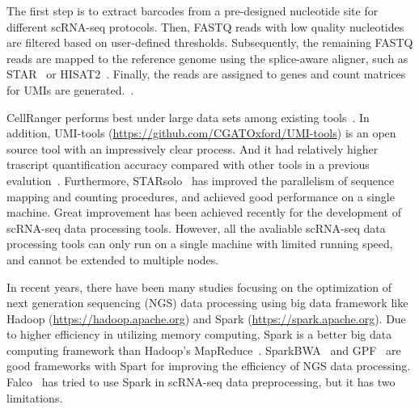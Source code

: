 \documentclass[conference]{IEEEtran}
\begin{document}
The first step is to extract barcodes from a pre-designed nucleotide site for different scRNA-seq protocols. Then, FASTQ reads with low quality nucleotides are filtered based on user-defined thresholds. 
Subsequently, the remaining FASTQ reads are mapped to the reference genome using the splice-aware aligner, such as STAR~\cite{Dobin2013STAR} or HISAT2~\cite{Kim2015HISAT}. 
Finally, the reads are assigned to genes and count matrices for UMIs are generated.~\cite{Parekh2018zUMIs}. 


CellRanger performs best under large data sets among existing tools~\cite{Gao2020Comparison}.
In addition, UMI-tools (\url{https://github.com/CGATOxford/UMI-tools}) is an open source tool with an impressively clear process. And it had relatively higher trascript quantification accuracy compared with other tools in a previous evalution~\cite{Gao2020Comparison}. 
Furthermore, STARsolo~\cite{Blibaum2019STARsolo} has improved the parallelism of sequence mapping and counting procedures, and achieved good performance on a single machine.
Great improvement has been achieved recently for the development of scRNA-seq data processing tools. However, all the avaliable scRNA-seq data processing tools can only run on a single machine with limited running speed, and cannot be extended to multiple nodes.

In recent years, there have been many studies focusing on the optimization of next generation sequencing (NGS) data processing using big data framework like Hadoop (\url{https://hadoop.apache.org}) and Spark (\url{https://spark.apache.org}). 
Due to higher efficiency in utilizing memory computing, Spark is a better big data computing framework than Hadoop's MapReduce~\cite{Dean2008MapReduce, Zaharia2012Resilient}. 
SparkBWA~\cite{Abun2016SparkBWA} and GPF~\cite{Li2018Highperformance} are good frameworks with Spart for improving the efficiency of NGS data processing. 
Falco~\cite{Yang2017Falco} has tried to use Spark in scRNA-seq data preprocessing, but it has two limitations. 
\end{document}
